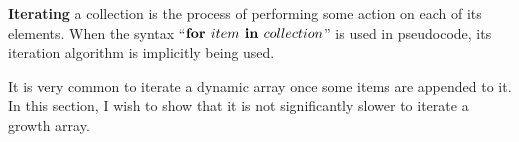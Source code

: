 \textbf{Iterating} a collection is the process of performing some action on each of its elements. When the syntax ``$\textbf{for } item \textbf{ in } collection$'' is used in pseudocode, its iteration algorithm is implicitly being used.

It is very common to iterate a dynamic array once some items are appended to it. In this section, I wish to show that it is not significantly slower to iterate a growth array.
